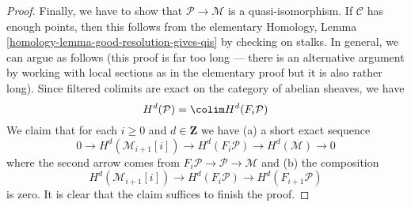 \begin{proof}
\medskip\noindent
Finally, we have to show that $\mathcal{P} \to \mathcal{M}$
is a quasi-isomorphism. If $\mathcal{C}$ has enough points, then
this follows from the elementary
Homology, Lemma \ref{homology-lemma-good-resolution-gives-qis}
by checking on stalks. In general, we can argue as follows
(this proof is far too long --- there is an alternative argument by
working with local sections as in the elementary proof but it
is also rather long).
Since filtered colimits are exact on the category of abelian
sheaves, we have
$$
H^d(\mathcal{P}) = \colim H^d(F_i\mathcal{P})
$$
We claim that for each $i \geq 0$ and $d \in \mathbf{Z}$
we have (a) a short exact sequence
$$
0 \to H^d(\mathcal{M}_{i + 1}[i]) \to
H^d(F_i\mathcal{P}) \to H^d(\mathcal{M}) \to 0
$$
where the second arrow comes from
$F_i\mathcal{P} \to \mathcal{P} \to \mathcal{M}$
and (b) the composition
$$
H^d(\mathcal{M}_{i + 1}[i]) \to
H^d(F_i\mathcal{P}) \to
H^d(F_{i + 1}\mathcal{P})
$$
is zero. It is clear that the claim suffices to finish the proof.


\end{proof}
